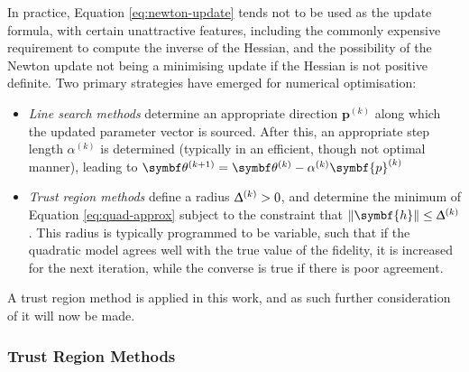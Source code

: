 In practice, Equation \ref{eq:newton-update} tends not to be used as the
update formula, with certain unattractive features, including the commonly
expensive requirement to compute the inverse of the Hessian, and the
possibility of the Newton update not being a minimising update if the Hessian
is not positive definite. Two primary strategies have emerged for numerical
optimisation:
\begin{itemize}
    \item \emph{Line search methods}\cite[Chapter 3]{Nocedal2006} determine an
        appropriate direction $\symbf{p}^{(k)}$ along which the updated
        parameter vector is sourced.  After this, an appropriate step length
        $\alpha^{(k)}$ is determined (typically in an efficient, though not
        optimal manner), leading to $\bthkplusone = \bthk -
        \alpha^{(k)}\symbf{p}^{(k)}$
    \item \emph{Trust region methods}\cite[Chapter 4]{Nocedal2006} define a
        radius $\Updelta^{(k)} > 0$, and determine the minimum of Equation
        \ref{eq:quad-approx} subject to the constraint that
        $\left\lVert\symbf{h}\right\rVert \leq \Updelta^{(k)}$. This radius is
        typically programmed to be variable, such that if the quadratic model
        agrees well with the true value of the fidelity, it is increased for
        the next iteration, while the converse is true if there is poor
        agreement.
\end{itemize}
A trust region method is applied in this work, and as such further
consideration of it will now be made.

\subsubsection{Trust Region Methods}

